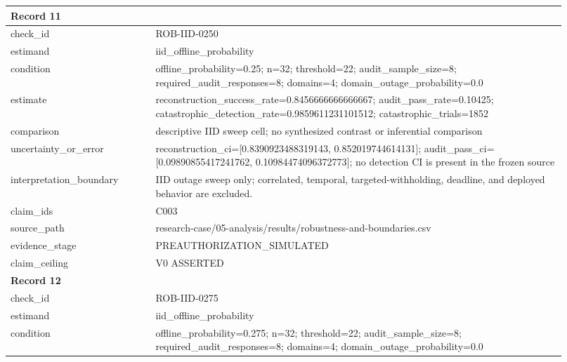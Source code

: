 \begin{longtable}{|p{0.24\linewidth}|p{0.68\linewidth}|}
\multicolumn{2}{|l|}{\textbf{Record 11}} \\ \hline
check\_\allowbreak{}id & ROB-IID-0250 \\ \hline
estimand & iid\_\allowbreak{}offline\_\allowbreak{}probability \\ \hline
condition & offline\_\allowbreak{}probability=0.25;\allowbreak{} n=32;\allowbreak{} threshold=22;\allowbreak{} audit\_\allowbreak{}sample\_\allowbreak{}size=8;\allowbreak{} required\_\allowbreak{}audit\_\allowbreak{}responses=8;\allowbreak{} domains=4;\allowbreak{} domain\_\allowbreak{}outage\_\allowbreak{}probability=0.0 \\ \hline
estimate & reconstruction\_\allowbreak{}success\_\allowbreak{}rate=0.8456666666666667;\allowbreak{} audit\_\allowbreak{}pass\_\allowbreak{}rate=0.10425;\allowbreak{} catastrophic\_\allowbreak{}detection\_\allowbreak{}rate=0.9859611231101512;\allowbreak{} catastrophic\_\allowbreak{}trials=1852 \\ \hline
comparison & descriptive IID sweep cell;\allowbreak{} no synthesized contrast or inferential comparison \\ \hline
uncertainty\_\allowbreak{}or\_\allowbreak{}error & reconstruction\_\allowbreak{}ci=[0.8390923488319143, 0.852019744614131];\allowbreak{} audit\_\allowbreak{}pass\_\allowbreak{}ci=[0.09890855417241762, 0.10984474096372773];\allowbreak{} no detection CI is present in the frozen source \\ \hline
interpretation\_\allowbreak{}boundary & IID outage sweep only;\allowbreak{} correlated, temporal, targeted-withholding, deadline, and deployed behavior are excluded. \\ \hline
claim\_\allowbreak{}ids & C003 \\ \hline
source\_\allowbreak{}path & research-case/05-analysis/results/robustness-and-boundaries.csv \\ \hline
evidence\_\allowbreak{}stage & PREAUTHORIZATION\_\allowbreak{}SIMULATED \\ \hline
claim\_\allowbreak{}ceiling & V0 ASSERTED \\ \hline
\multicolumn{2}{|l|}{\textbf{Record 12}} \\ \hline
check\_\allowbreak{}id & ROB-IID-0275 \\ \hline
estimand & iid\_\allowbreak{}offline\_\allowbreak{}probability \\ \hline
condition & offline\_\allowbreak{}probability=0.275;\allowbreak{} n=32;\allowbreak{} threshold=22;\allowbreak{} audit\_\allowbreak{}sample\_\allowbreak{}size=8;\allowbreak{} required\_\allowbreak{}audit\_\allowbreak{}responses=8;\allowbreak{} domains=4;\allowbreak{} domain\_\allowbreak{}outage\_\allowbreak{}probability=0.0 \\ \hline

\end{longtable}
